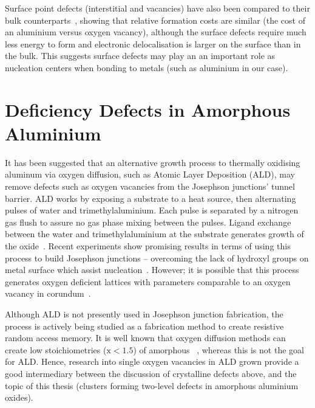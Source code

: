 Surface point defects (interstitial and vacancies) have also been compared to their bulk counterparts~\cite{Carrasco2004}, showing that relative formation costs are similar (\ie the cost of an aluminium versus oxygen vacancy), although the surface defects require much less energy to form and electronic delocalisation is larger on the surface than in the bulk.
This suggests surface defects may play an an important role as nucleation centers when bonding to metals (such as aluminium in our case).

\section[toclisting][headlisting]{Deficiency Defects in Amorphous Aluminium}

It has been suggested that an alternative growth process to thermally oxidising aluminum via oxygen diffusion, such as Atomic Layer Deposition (ALD), may remove defects such as oxygen vacancies from the Josephson junctions' tunnel barrier.
ALD works by exposing a substrate to a heat source, then alternating pulses of water and trimethylaluminium.
Each pulse is separated by a nitrogen gas flush to assure no gas phase mixing between the pulses.
Ligand exchange between the water and trimethylaluminium at the substrate generates growth of the oxide~\cite{George2010}.
Recent experiments show promising results in terms of using this process to build Josephson junctions -- overcoming the lack of hydroxyl groups on metal surface which assist nucleation~\cite{Elliot2013}.
However; it is possible that this process generates oxygen deficient lattices with parameters comparable to an oxygen vacancy in corundum~\cite{Perevalov2010}.

Although ALD is not presently used in Josephson junction fabrication, the process is actively being studied as a fabrication method to create resistive random access memory.
It is well known that oxygen diffusion methods can create low stoichiometries (\ie $\text{x}<1.5$) of amorphous ~\cite{Park2002, Tan2005}, whereas this is not the goal for ALD.
Hence, research into single oxygen vacancies in ALD grown  provide a good intermediary between the discussion of crystalline defects above, and the topic of this thesis (clusters forming two-level defects in amorphous aluminium oxides).

